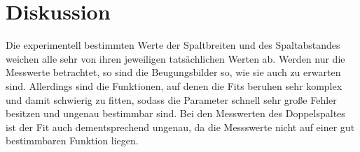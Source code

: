 \section{Diskussion}
\label{sec:Diskussion}

Die experimentell bestimmten Werte der Spaltbreiten und des Spaltabstandes
weichen alle sehr von ihren jeweiligen tatsächlichen Werten ab.
Werden nur die Messwerte betrachtet, so sind die Beugungsbilder so,
wie sie auch zu erwarten sind. Allerdings sind die Funktionen,
auf denen die Fits beruhen sehr komplex und damit schwierig zu fitten,
sodass die Parameter schnell sehr große Fehler besitzen und ungenau bestimmbar
sind. Bei den Messwerten des Doppelspaltes ist der Fit auch dementsprechend
ungenau, da die Messswerte nicht auf einer gut bestimmbaren Funktion liegen.
